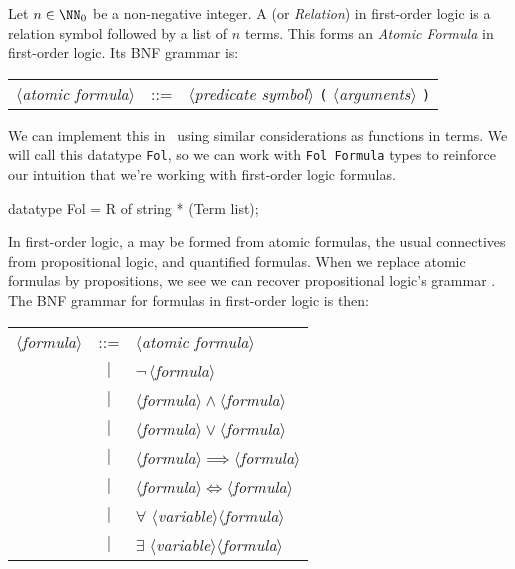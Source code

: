 \begin{node}[Syntax]
\begin{definition}\label{fol-0003}%
Let $n\in\NN_{0}$ be a non-negative integer. A  (or
\emph{Relation}) in first-order logic is a relation symbol followed by a
list of $n$ terms. This forms an \textit{Atomic Formula} in first-order logic.
Its BNF grammar is:
\begin{center}
\begin{tabular}{rcl}
$\langle$\textit{atomic formula}$\rangle$ & ::= & $\langle$\textit{predicate symbol}$\rangle$ \verb#(# $\langle$\textit{arguments}$\rangle$ \verb#)#\\
\end{tabular}
\end{center}

\begin{node}\label{fol-000L}%
We can implement this in \SML\ using similar considerations as functions
in terms. We will call this datatype \lstinline{Fol}, so we can work
with \texttt{Fol Formula} types to reinforce our intuition that we're
working with first-order logic formulas.

\begin{sml}
datatype Fol = R of string * (Term list);
\end{sml}
\end{node}
\end{definition}

\begin{definition}\label{fol-0004}%
In first-order logic, a  may be formed from atomic
formulas, the usual connectives from propositional logic, and quantified
formulas. When we replace atomic formulas by propositions, we see we can
recover propositional logic's grammar . The BNF grammar
for formulas in first-order logic is then: 
\begin{center}
\begin{tabular}{rcl}
$\langle$\textit{formula}$\rangle$ & ::= & $\langle$\textit{atomic formula}$\rangle$\\
& $|$ & $\neg\,\langle$\textit{formula}$\rangle$\\
& $|$ & $\langle$\textit{formula}$\rangle\land\langle$\textit{formula}$\rangle$\\
& $|$ & $\langle$\textit{formula}$\rangle\lor\langle$\textit{formula}$\rangle$\\
& $|$ & $\langle$\textit{formula}$\rangle\implies\langle$\textit{formula}$\rangle$\\
& $|$ & $\langle$\textit{formula}$\rangle\iff\langle$\textit{formula}$\rangle$\\
& $|$ & $\forall$ $\langle$\textit{variable}$\rangle\langle$\textit{formula}$\rangle$\\
& $|$ & $\exists$ $\langle$\textit{variable}$\rangle\langle$\textit{formula}$\rangle$\\
\end{tabular}
\end{center}
\end{definition}
\end{node}
